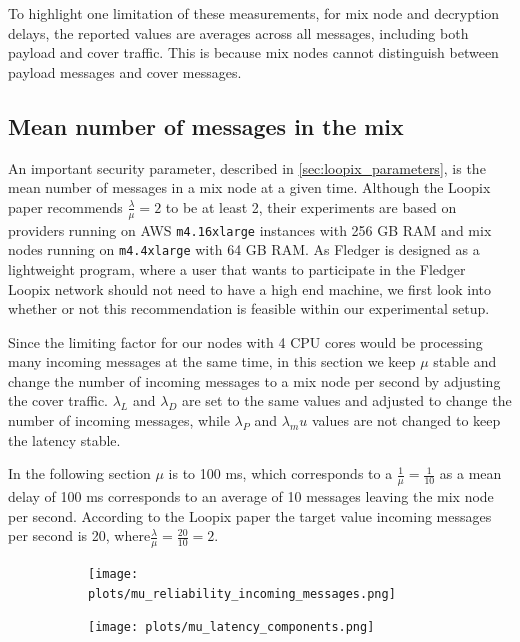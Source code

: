 \documentclass[a4paper,11pt,oneside]{report}
\begin{document}
To highlight one limitation of these measurements, for mix node and decryption delays, the reported values are averages across all messages, including both payload and cover traffic. This is because mix nodes cannot distinguish between payload messages and cover messages.
\subsection{Mean number of messages in the mix}
\label{sec:mu}
An important security parameter, described in \autoref{sec:loopix_parameters}, is the mean number of messages in a mix node at a given time. Although the Loopix paper recommends \(\frac{\lambda}{\mu} = 2\) to be at least 2, their experiments are based on providers running on AWS \texttt{m4.16xlarge} instances with 256 GB RAM and mix nodes running on \texttt{m4.4xlarge} with 64 GB RAM. As Fledger is designed as a lightweight program, where a user that wants to participate in the Fledger Loopix network should not need to have a high end machine, we first look into whether or not this recommendation is feasible within our experimental setup.

Since the limiting factor for our nodes with 4 CPU cores would be processing many incoming messages at the same time, in this section we keep \(\mu\) stable and change the number of incoming messages to a mix node per second by adjusting the cover traffic. \(\lambda_L\) and \(\lambda_D\) are set to the same values and adjusted to change the number of incoming messages, while \(\lambda_P\) and \(\lambda_mu\) values are not changed to keep the latency stable.

In the following section \(\mu\) is to 100 ms, which corresponds to a \(\frac{1}{\mu} = \frac{1}{10}\) as a mean delay of 100 ms corresponds to an average of 10 messages leaving the mix node per second. According to the Loopix paper the target value incoming messages per second is 20, where\(\frac{\lambda}{\mu} = \frac{20}{10} = 2\).

\begin{figure}[H]
    \centering
    \begin{subfigure}{\textwidth}
        \centering
        \texttt{[image: plots/mu\_reliability\_incoming\_messages.png]}
        \caption{}
        \label{fig:mu_incoming_reliability}
    \end{subfigure}
    \hfill
    \centering
    \begin{subfigure}{\textwidth}
        \centering
        \texttt{[image: plots/mu\_latency\_components.png]}
        \caption{}
        \label{fig:mu_latency}
    \end{subfigure}
\end{figure}
\end{document}
